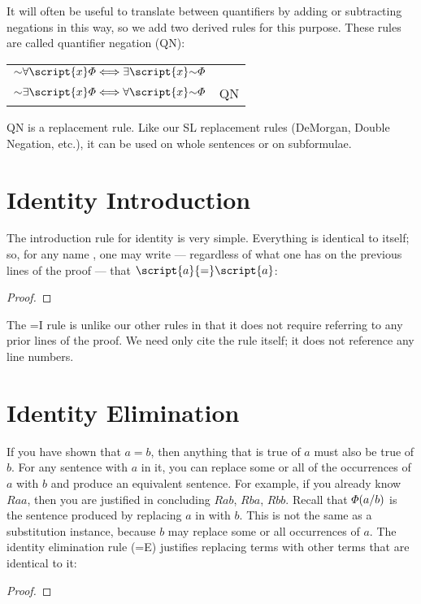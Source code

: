 It will often be useful to translate between quantifiers by adding or subtracting negations in this way, so we add two derived rules for this purpose. These rules are called quantifier negation (QN):
\begin{center}
\begin{tabular}{rl}
$\enot\qt{\forall}{\script{x}}\metaA{} \Longleftrightarrow \qt{\exists}{\script{x}}\enot\metaA{}$\\
$\enot\qt{\exists}{\script{x}}\metaA{} \Longleftrightarrow \qt{\forall}{\script{x}}\enot\metaA{}$
& QN
\end{tabular}
\end{center}
QN is a replacement rule. Like our SL replacement rules (DeMorgan, Double Negation, etc.), it can be used on whole sentences or on subformulae.

\section{Identity Introduction}

The introduction rule for identity is very simple. Everything is identical to itself; so, for any name , one may write --- regardless of what one has on the previous lines of the proof --- that $\script{a}{=}\script{a}$:

\begin{proof}
	 
\end{proof}

The {=}I rule is unlike our other rules in that it does not require referring to any prior lines of the proof. We need only cite the rule itself; it does not reference any line numbers.

\section{Identity Elimination}

If you have shown that $a{=}b$, then anything that is true of $a$ must also be true of $b$. For any sentence with $a$ in it, you can replace some or all of the occurrences of $a$ with $b$ and produce an equivalent sentence. For example, if you already know $Raa$, then you are justified in concluding $Rab$, $Rba$, $Rbb$. Recall that $\varPhi{}(a/b)$ is the sentence produced by replacing $a$ in \metaA{} with $b$. This is not the same as a substitution instance, because $b$ may replace some or all occurrences of $a$. The identity elimination rule ({=}E) justifies replacing terms with other terms that are identical to it:
\begin{proof}
	 
	 
\end{proof}

